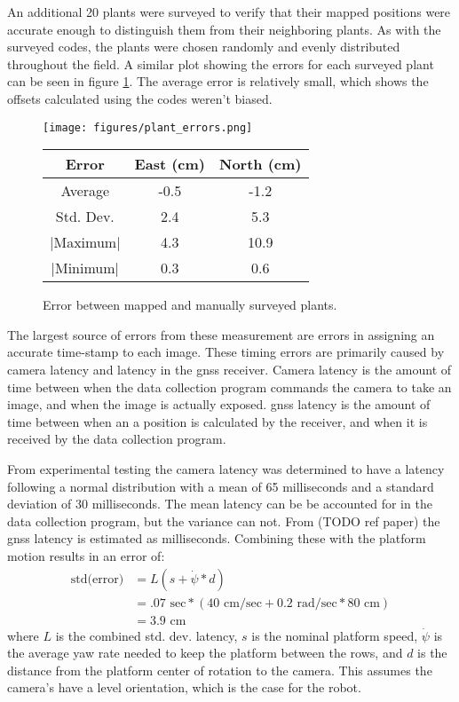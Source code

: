 An additional 20 plants were surveyed to verify that their mapped positions were accurate enough to distinguish them from their neighboring plants.  As with the surveyed codes, the plants were chosen randomly and evenly distributed throughout the field.   A similar plot showing the errors for each surveyed plant can be seen in figure \ref{figure:plant_errors}.  The average error is relatively small, which shows the offsets calculated using the codes weren't biased.   

  \begin{figure}
	\centering
    \texttt{[image: figures/plant\_errors.png]}
    \label{figure:plant_errors}
    \newline
    \newline
    \centering
    \begin{tabular}[c]{|c|c|c|}
        \hline
        Error & East (cm) & North (cm) \\ 
        \hline
        Average   & -0.5 & -1.2           \\
        Std. Dev. & 2.4 & 5.3       \\
        $|$Maximum$|$   & 4.3 & 10.9       \\
        $|$Minimum$|$   & 0.3 & 0.6       \\
        \hline
    \end{tabular}
    \captionsetup{labelformat=andtable}
    \caption{Error between mapped and manually surveyed plants.}
  \end{figure}

The largest source of errors from these measurement are errors in assigning an accurate time-stamp to each image.  These timing errors are primarily caused by camera latency and latency in the \ac{gnss} receiver.  Camera latency is the amount of time between when the data collection program commands the camera to take an image, and when the image is actually exposed.  \ac{gnss} latency is the amount of time between when an a position is calculated by the receiver, and when it is received by the data collection program. 

From experimental testing the camera latency was determined to have a latency following a normal distribution with a mean of 65 milliseconds and a standard deviation of 30 milliseconds.  The mean latency can be be accounted for in the data collection program, but the variance can not. From (TODO ref paper) the \ac{gnss} latency is estimated as {} milliseconds. Combining these with the platform motion results in an error of:
\begin{align*}
 \text{std(error)} &= L (s + \dot{\psi}*d) \\
             &= .07 \text{ sec}* (40\text{ cm/sec} + 0.2 \text{ rad/sec} * 80 \text{ cm}) \\ 
             &= 3.9 \text{ cm}
\end{align*}
where $L$ is the combined std. dev. latency, $s$ is the nominal platform speed, $\dot{\psi}$ is the average yaw rate needed to keep the platform between the rows, and $d$ is the distance from the platform center of rotation to the camera.  This assumes the camera's have a level orientation, which is the case for the robot.

